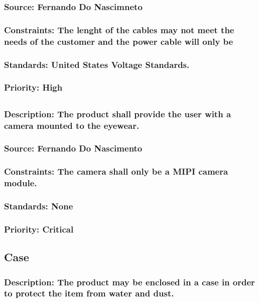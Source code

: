 \subsubsection{Source: Fernando Do Nascimneto}
\subsubsection{Constraints: The lenght of the cables may not meet the needs of the customer and the power cable will only be}
\subsubsection{Standards: United States Voltage Standards.}
\subsubsection{Priority: High}

\subsection{\bfCamera}
\subsubsection{Description: The product shall provide the user with a camera mounted to the eyewear.}
\subsubsection{Source: Fernando Do Nascimento}
\subsubsection{Constraints: The camera shall only be a MIPI camera module.}
\subsubsection{Standards: None}
\subsubsection{Priority: Critical}

\subsection{\bfProtective Case}
\subsubsection{Description: The product may be enclosed in a case in order to protect the item from water and dust.}
